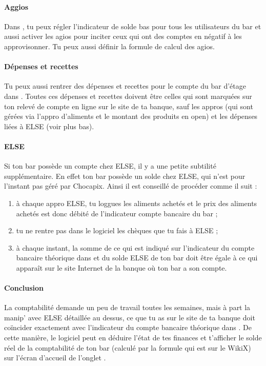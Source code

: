 \documentclass[12pt,french]{article}
\begin{document}
\paragraph{Aggios} Dans , tu peux régler l'indicateur de solde bas pour tous les utilisateurs du bar et aussi activer les agios pour inciter ceux qui ont des comptes en négatif à les approvisonner. Tu peux aussi définir la formule de calcul des agios.

\paragraph{Dépenses et recettes} Tu peux aussi rentrer des dépenses et recettes pour le compte du bar d'étage dans .%
Toutes ces dépenses et recettes doivent être celles qui sont marquées sur ton relevé de compte en ligne sur le site de ta banque, sauf les appros (qui sont gérées via l'appro d'aliments et le montant des produits en open) et les dépenses liées à ELSE (voir plus bas).

\paragraph{ELSE} Si ton bar possède un compte chez ELSE, il y a une petite subtilité supplémentaire. En effet ton bar possède un solde chez ELSE, qui n'est pour l'instant pas géré par Chocapix. Ainsi il est conseillé de procéder comme il suit :
\begin{enumerate}
	\item à chaque appro ELSE, tu loggues les aliments achetés et le prix des aliments achetés est donc débité de l'indicateur compte bancaire du bar ;
	\item tu ne rentre pas dans le logiciel les chèques que tu fais à ELSE ;
	\item à chaque instant, la somme de ce qui est indiqué sur l'indicateur du compte bancaire théorique dans  et du solde ELSE de ton bar doit être égale à ce qui apparaît sur le site Internet de la banque où ton bar a son compte.
\end{enumerate}

\paragraph{Conclusion} La comptabilité demande un peu de travail toutes les semaines, mais à part la manip' avec ELSE détaillée au dessus, ce que tu as sur le site de ta banque doit coïncider exactement avec l'indicateur du compte bancaire théorique dans . De cette manière, le logiciel peut en déduire l'état de tes finances et t'afficher le solde réel de la comptabilité de ton bar (calculé par la formule qui est sur le WikiX) sur l'écran d'accueil de l'onglet .
\end{document}
